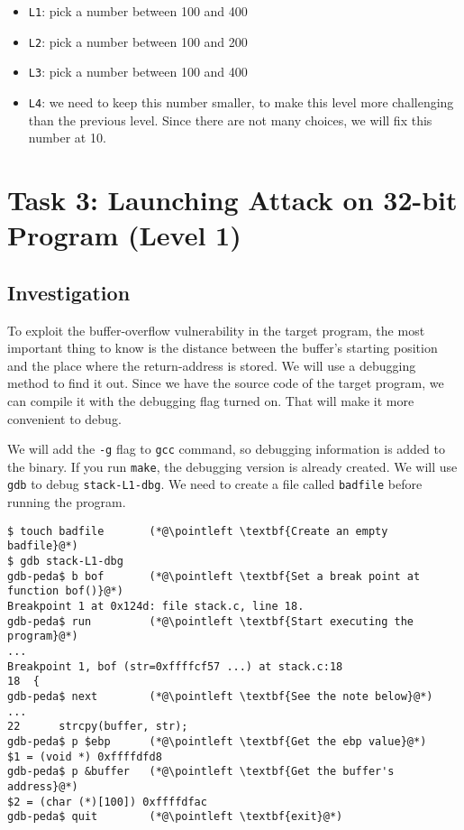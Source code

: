 \begin{itemize}[noitemsep]
\item \texttt{L1}: pick a number between 100 and 400 
\item \texttt{L2}: pick a number between 100 and 200 
\item \texttt{L3}: pick a number between 100 and 400 
\item \texttt{L4}: we need to keep this number smaller, 
to make this level more challenging than the previous level.
Since there are not many choices, we will fix this number at 10.
\end{itemize}
 




\section{Task 3: Launching Attack on 32-bit Program (Level 1)}

\subsection{Investigation} 

To exploit the buffer-overflow vulnerability in the target program,
the most important thing to know is the distance between the 
buffer's starting position and the place where the return-address
is stored. We will use a debugging method to find it out.
Since we have the source code of the target program, we
can compile it with the debugging flag turned on. That will make it more
convenient to debug. 

We will add the \texttt{-g} flag to \texttt{gcc} command, so debugging information
is added to the binary. If you run \texttt{make}, the debugging version
is already created. We will use \texttt{gdb} to debug \texttt{stack-L1-dbg}.  
We need to create a file called
\texttt{badfile} before running the program. 


\newcommand{\pointleft}{\reflectbox{\ding{221}}\xspace}

\begin{lstlisting}
$ touch badfile       (*@\pointleft \textbf{Create an empty badfile}@*)
$ gdb stack-L1-dbg
gdb-peda$ b bof       (*@\pointleft \textbf{Set a break point at function bof()}@*)
Breakpoint 1 at 0x124d: file stack.c, line 18.
gdb-peda$ run         (*@\pointleft \textbf{Start executing the program}@*)
...
Breakpoint 1, bof (str=0xffffcf57 ...) at stack.c:18
18  {
gdb-peda$ next        (*@\pointleft \textbf{See the note below}@*)
...
22	    strcpy(buffer, str);
gdb-peda$ p $ebp      (*@\pointleft \textbf{Get the ebp value}@*)
$1 = (void *) 0xffffdfd8   
gdb-peda$ p &buffer   (*@\pointleft \textbf{Get the buffer's address}@*)
$2 = (char (*)[100]) 0xffffdfac
gdb-peda$ quit        (*@\pointleft \textbf{exit}@*)
\end{lstlisting}

